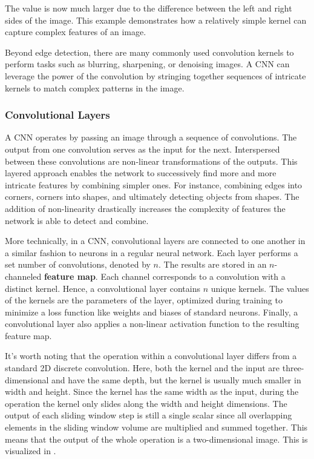 The value is now much larger due to the difference between the left and right sides of the image. This example demonstrates how a relatively simple kernel can capture complex features of an image.

Beyond edge detection, there are many commonly used convolution kernels to perform tasks such as blurring, sharpening, or denoising images. A CNN can leverage the power of the convolution by stringing together sequences of intricate kernels to match complex patterns in the image.

\subsubsection{Convolutional Layers}

A CNN operates by passing an image through a sequence of convolutions. The output from one convolution serves as the input for the next. Interspersed between these convolutions are non-linear transformations of the outputs. This layered approach enables the network to successively find more and more intricate features by combining simpler ones. For instance, combining edges into corners, corners into shapes, and ultimately detecting objects from shapes. The addition of non-linearity drastically increases the complexity of features the network is able to detect and combine.

More technically, in a CNN, convolutional layers are connected to one another in a similar fashion to neurons in a regular neural network. Each layer performs a set number of convolutions, denoted by $n$. The results are stored in an $n$-channeled \textbf{feature map}. Each channel corresponds to a convolution with a distinct kernel. Hence, a convolutional layer contains $n$ unique kernels. The values of the kernels are the parameters of the layer, optimized during training to minimize a loss function like weights and biases of standard neurons. Finally, a convolutional layer also applies a non-linear activation function to the resulting feature map.

It's worth noting that the operation within a convolutional layer differs from a standard 2D discrete convolution. Here, both the kernel and the input are three-dimensional and have the same depth, but the kernel is usually much smaller in width and height. Since the kernel has the same width as the input, during the operation the kernel only slides along the width and height dimensions. The output of each sliding window step is still a single scalar since all overlapping elements in the sliding window volume are multiplied and summed together. This means that the output of the whole operation is a two-dimensional image. This is visualized in .

